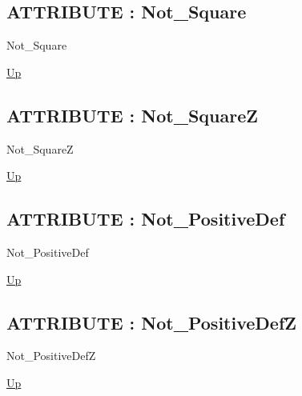 \par
\par
\subsection*{ATTRIBUTE : Not\_Square}
\hypertarget{ecldoc:pbblas.constants.not_square}{}
\begin{minipage}[t]{\textwidth}
\begin{flushleft}
 Not\_Square 
\end{flushleft}
\end{minipage}
\hyperlink{ecldoc:PBblas.Constants}{Up}

\par
\par
\subsection*{ATTRIBUTE : Not\_SquareZ}
\hypertarget{ecldoc:pbblas.constants.not_squarez}{}
\begin{minipage}[t]{\textwidth}
\begin{flushleft}
 Not\_SquareZ 
\end{flushleft}
\end{minipage}
\hyperlink{ecldoc:PBblas.Constants}{Up}

\par
\par
\subsection*{ATTRIBUTE : Not\_PositiveDef}
\hypertarget{ecldoc:pbblas.constants.not_positivedef}{}
\begin{minipage}[t]{\textwidth}
\begin{flushleft}
 Not\_PositiveDef 
\end{flushleft}
\end{minipage}
\hyperlink{ecldoc:PBblas.Constants}{Up}

\par
\par
\subsection*{ATTRIBUTE : Not\_PositiveDefZ}
\hypertarget{ecldoc:pbblas.constants.not_positivedefz}{}
\begin{minipage}[t]{\textwidth}
\begin{flushleft}
 Not\_PositiveDefZ 
\end{flushleft}
\end{minipage}
\hyperlink{ecldoc:PBblas.Constants}{Up}


